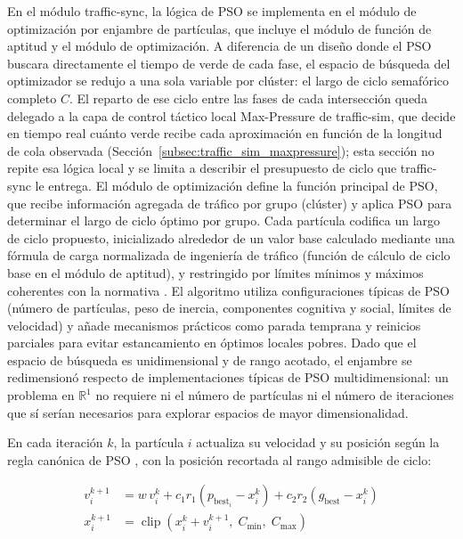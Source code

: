 En el módulo traffic-sync, la lógica de PSO se implementa en el módulo de optimización por enjambre de partículas, que incluye el módulo de función de aptitud y el módulo de optimización. A diferencia de un diseño donde el PSO buscara directamente el tiempo de verde de cada fase, el espacio de búsqueda del optimizador se redujo a una sola variable por clúster: el largo de ciclo semafórico completo $C$. El reparto de ese ciclo entre las fases de cada intersección queda delegado a la capa de control táctico local Max-Pressure de traffic-sim, que decide en tiempo real cuánto verde recibe cada aproximación en función de la longitud de cola observada (Sección~\ref{subsec:traffic_sim_maxpressure}); esta sección no repite esa lógica local y se limita a describir el presupuesto de ciclo que traffic-sync le entrega. El módulo de optimización define la función principal de PSO, que recibe información agregada de tráfico por grupo (clúster) y aplica PSO para determinar el largo de ciclo óptimo por grupo. Cada partícula codifica un largo de ciclo propuesto, inicializado alrededor de un valor base calculado mediante una fórmula de carga normalizada de ingeniería de tráfico (función de cálculo de ciclo base en el módulo de aptitud), y restringido por límites mínimos y máximos coherentes con la normativa \cite{webster1958traffic,garber2019traffic}. El algoritmo utiliza configuraciones típicas de PSO (número de partículas, peso de inercia, componentes cognitiva y social, límites de velocidad) y añade mecanismos prácticos como parada temprana y reinicios parciales para evitar estancamiento en óptimos locales pobres. Dado que el espacio de búsqueda es unidimensional y de rango acotado, el enjambre se redimensionó respecto de implementaciones típicas de PSO multidimensional: un problema en $\mathbb{R}^1$ no requiere ni el número de partículas ni el número de iteraciones que sí serían necesarios para explorar espacios de mayor dimensionalidad.

En cada iteración $k$, la partícula $i$ actualiza su velocidad y su posición según la regla
canónica de PSO \cite{kennedy1995particle,shi1998parameter}, con la posición recortada al rango
admisible de ciclo:

\begin{equation}
\begin{aligned}
v_i^{k+1} &= w\,v_i^{k} + c_1 r_1 \left(p_{\text{best}_i} - x_i^{k}\right)
                        + c_2 r_2 \left(g_{\text{best}} - x_i^{k}\right) \\
x_i^{k+1} &= \operatorname{clip}\left(x_i^{k} + v_i^{k+1},\; C_{\min},\; C_{\max}\right)
\end{aligned}
\label{eq:pso_update}
\end{equation}

